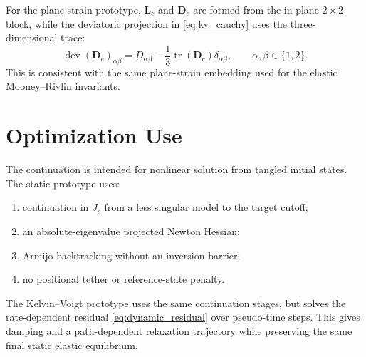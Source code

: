 \documentclass[11pt]{article}
\newcommand{\tr}{\operatorname{tr}}
\newcommand{\dev}{\operatorname{dev}}
\begin{document}
For the plane-strain prototype, $\bm L_c$ and $\bm D_c$ are formed from the
in-plane $2\times2$ block, while the deviatoric projection in
\eqref{eq:kv_cauchy} uses the three-dimensional trace:
\begin{equation}
  \dev(\bm D_c)_{\alpha\beta}
  =
  D_{\alpha\beta}
  -
  \frac{1}{3}\tr(\bm D_c)\delta_{\alpha\beta},
  \qquad \alpha,\beta\in\{1,2\}.
\end{equation}
This is consistent with the same plane-strain embedding used for the elastic
Mooney--Rivlin invariants.

\section{Optimization Use}

The continuation is intended for nonlinear solution from tangled initial
states. The static prototype uses:
\begin{enumerate}
  \item continuation in $J_c$ from a less singular model to the target cutoff;
  \item an absolute-eigenvalue projected Newton Hessian;
  \item Armijo backtracking without an inversion barrier;
  \item no positional tether or reference-state penalty.
\end{enumerate}
The Kelvin--Voigt prototype uses the same continuation stages, but solves the
rate-dependent residual \eqref{eq:dynamic_residual} over pseudo-time steps.
This gives damping and a path-dependent relaxation trajectory while preserving
the same final static elastic equilibrium.
\end{document}

